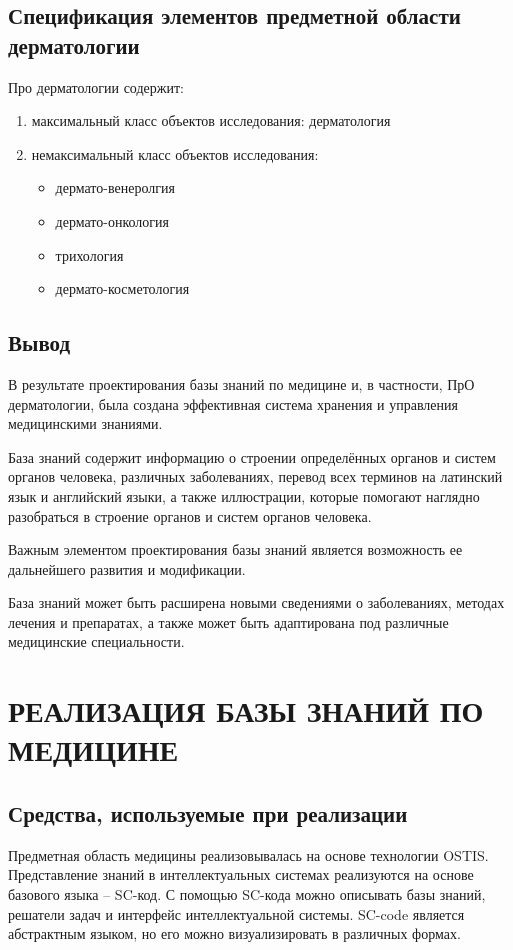 \subsection{Спецификация элементов предметной области дерматологии}
Про дерматологии содержит:
\begin{enumerate}
	\item максимальный класс объектов исследования: дерматология
	\item немаксимальный класс объектов исследования: \begin{itemize}
		\item дермато-венеролгия
		\item дермато-онкология
		\item трихология 
		\item дермато-косметология\\
	\end{itemize}
\end{enumerate}
\subsection{Вывод}
В результате проектирования базы знаний по медицине и, в частности,
ПрО дерматологии, была создана эффективная система хранения и управления медицинскими знаниями.

База знаний содержит информацию о строении определённых органов и систем органов человека, различных заболеваниях, перевод всех терминов на латинский язык и английский языки, а также иллюстрации, которые помогают наглядно разобраться в строение органов и систем органов человека.

Важным элементом проектирования базы знаний является возможность ее дальнейшего развития и модификации.

База знаний может быть расширена новыми сведениями о заболеваниях, методах лечения и препаратах, а также может быть адаптирована под различные медицинские специальности.

\section{РЕАЛИЗАЦИЯ БАЗЫ ЗНАНИЙ ПО МЕДИЦИНЕ}
\subsection{Средства, используемые при реализации}
Предметная область медицины реализовывалась на основе технологии OSTIS. Представление знаний в интеллектуальных системах реализуются на основе базового языка – SC-код. С помощью SC-кода можно описывать базы знаний, решатели задач и интерфейс интеллектуальной системы. SC-code является абстрактным языком, но его можно визуализировать в различных формах. 

